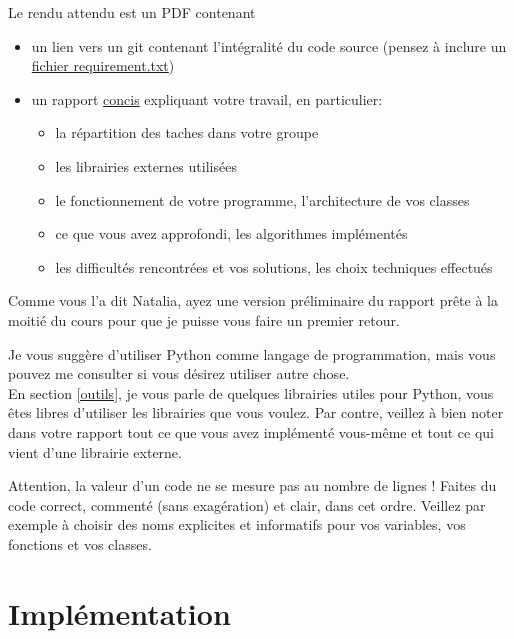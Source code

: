 \documentclass{article}
\begin{document}
\noindent Le rendu attendu est un PDF contenant
\begin{itemize}
    \item un lien vers un git contenant l'intégralité du code source (pensez à inclure un \href{https://pip.pypa.io/en/stable/user_guide/#requirements-files}{fichier requirement.txt})
    \item un rapport \underline{concis} expliquant votre travail, en particulier:
    \begin{itemize}
        \item la répartition des taches dans votre groupe
        \item les librairies externes utilisées
        \item le fonctionnement de votre programme, l'architecture de vos classes
        \item ce que vous avez approfondi, les algorithmes implémentés
        \item les difficultés rencontrées et vos solutions, les choix techniques effectués
    \end{itemize}
\end{itemize}
Comme vous l'a dit Natalia, ayez une version préliminaire du rapport prête à la moitié du cours pour que je puisse vous faire un premier retour.

\vspace{1em}

\noindent Je vous suggère d'utiliser Python comme langage de programmation, mais vous pouvez me consulter si vous désirez utiliser autre chose. \\
En section \ref{outils}, je vous parle de quelques librairies utiles pour Python, vous êtes libres d'utiliser les librairies que vous voulez. Par contre, veillez à bien noter dans votre rapport tout ce que vous avez implémenté vous-même et tout ce qui vient d'une librairie externe.

Attention, la valeur d'un code ne se mesure pas au nombre de lignes ! Faites du code correct, commenté (sans exagération) et clair, dans cet ordre. Veillez par exemple à choisir des noms explicites et informatifs pour vos variables, vos fonctions et vos classes.

\section{Implémentation}
\end{document}

